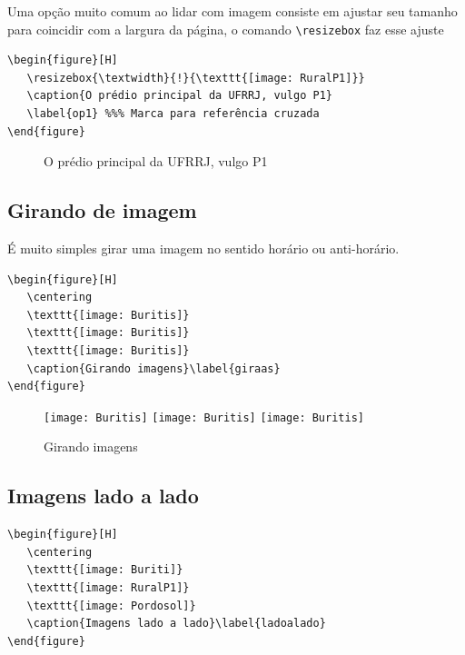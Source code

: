 Uma opção muito comum ao lidar com imagem consiste em ajustar seu tamanho para coincidir com a largura da página, o comando \verb|\resizebox| faz esse ajuste
\begin{tcolorbox}
\begin{lstlisting}
\begin{figure}[H]
   \resizebox{\textwidth}{!}{\texttt{[image: RuralP1]}}
   \caption{O prédio principal da UFRRJ, vulgo P1}
   \label{op1} %%% Marca para referência cruzada
\end{figure}
\end{lstlisting}
\end{tcolorbox}
\begin{figure}[H]
	\caption{O prédio principal da UFRRJ, vulgo P1}
	\label{op1}
\end{figure}

\subsection{Girando de imagem}

É muito simples girar uma imagem no sentido horário ou anti-horário.
\begin{tcolorbox}
\begin{lstlisting}
\begin{figure}[H]
   \centering
   \texttt{[image: Buritis]}
   \texttt{[image: Buritis]}
   \texttt{[image: Buritis]}
   \caption{Girando imagens}\label{giraas}
\end{figure}
\end{lstlisting}
\end{tcolorbox}

\begin{figure}[H]
	\centering
	\texttt{[image: Buritis]}
	\texttt{[image: Buritis]}
	\texttt{[image: Buritis]}
	\caption{Girando imagens}\label{giraas}
\end{figure}


\subsection{Imagens lado a lado}

\begin{tcolorbox}
\begin{lstlisting}
\begin{figure}[H]
   \centering
   \texttt{[image: Buriti]}
   \texttt{[image: RuralP1]}
   \texttt{[image: Pordosol]}
   \caption{Imagens lado a lado}\label{ladoalado}
\end{figure}
\end{lstlisting}
\end{tcolorbox}

